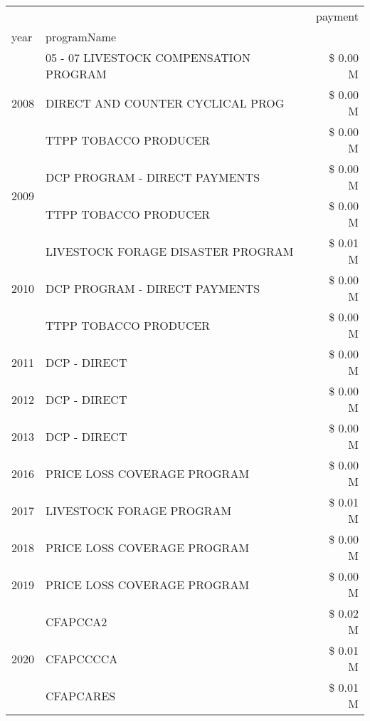 \begin{tabular}{llr}
\toprule
 &  & payment \\
year & programName &  \\
\midrule
\multirow[t]{3}{*}{2008} & 05 - 07 LIVESTOCK COMPENSATION PROGRAM & \$ 0.00 M \\
 & DIRECT AND COUNTER CYCLICAL PROG & \$ 0.00 M \\
 & TTPP TOBACCO PRODUCER & \$ 0.00 M \\
\cline{1-3}
\multirow[t]{2}{*}{2009} & DCP PROGRAM - DIRECT PAYMENTS & \$ 0.00 M \\
 & TTPP TOBACCO PRODUCER & \$ 0.00 M \\
\cline{1-3}
\multirow[t]{3}{*}{2010} & LIVESTOCK FORAGE DISASTER  PROGRAM & \$ 0.01 M \\
 & DCP PROGRAM - DIRECT PAYMENTS & \$ 0.00 M \\
 & TTPP TOBACCO PRODUCER & \$ 0.00 M \\
\cline{1-3}
2011 & DCP - DIRECT & \$ 0.00 M \\
\cline{1-3}
2012 & DCP - DIRECT & \$ 0.00 M \\
\cline{1-3}
2013 & DCP - DIRECT & \$ 0.00 M \\
\cline{1-3}
2016 & PRICE LOSS COVERAGE PROGRAM & \$ 0.00 M \\
\cline{1-3}
2017 & LIVESTOCK FORAGE PROGRAM & \$ 0.01 M \\
\cline{1-3}
2018 & PRICE LOSS COVERAGE PROGRAM & \$ 0.00 M \\
\cline{1-3}
2019 & PRICE LOSS COVERAGE PROGRAM & \$ 0.00 M \\
\cline{1-3}
\multirow[t]{3}{*}{2020} & CFAPCCA2 & \$ 0.02 M \\
 & CFAPCCCCA & \$ 0.01 M \\
 & CFAPCARES & \$ 0.01 M \\
\cline{1-3}
\bottomrule
\end{tabular}
